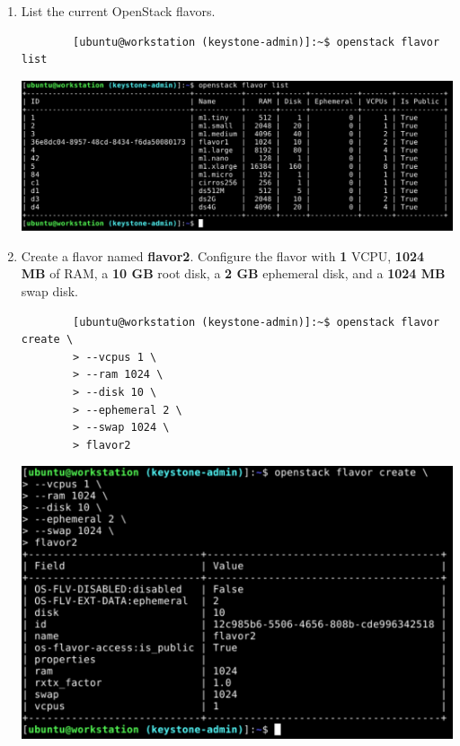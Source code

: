 \documentclass[letterpaper, 12pt]{article}
\begin{document}
\begin{enumerate}
    \item List the current OpenStack flavors.
    \begin{lstlisting}
        [ubuntu@workstation (keystone-admin)]:~$ openstack flavor list
    \end{lstlisting}

    \begin{center}
        \includegraphics[width=\linewidth]{images/part2/step7.png}
    \end{center}

    \item Create a flavor named \textbf{flavor2}.
    Configure the flavor with \textbf{1} VCPU, \textbf{1024 MB} of RAM, a \textbf{10 GB} root disk, a \textbf{2 GB} ephemeral disk, and a \textbf{1024 MB} swap disk.
    \begin{lstlisting}
        [ubuntu@workstation (keystone-admin)]:~$ openstack flavor create \
        > --vcpus 1 \
        > --ram 1024 \
        > --disk 10 \
        > --ephemeral 2 \
        > --swap 1024 \
        > flavor2
    \end{lstlisting}

    \begin{center}
        \includegraphics[width=\linewidth]{images/part2/step8.png}
    \end{center}


\end{enumerate}
\end{document}
